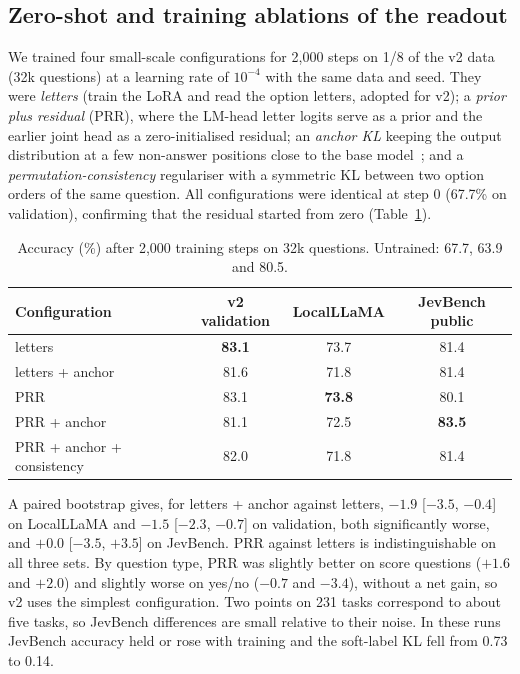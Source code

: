 \documentclass[10pt]{article}
\begin{document}
\subsection{Zero-shot and training ablations of the readout}
\label{sec:ablate}

We trained four small-scale configurations for 2,000 steps on 1/8 of the v2 data (32k questions) at a learning rate of $10^{-4}$ with the same data and seed.
They were \emph{letters} (train the LoRA and read the option letters, adopted for v2); a \emph{prior plus residual} (PRR), where the LM-head letter logits serve as a prior and the earlier joint head as a zero-initialised residual; an \emph{anchor KL} keeping the output distribution at a few non-answer positions close to the base model~\cite{llmjev}; and a \emph{permutation-consistency} regulariser with a symmetric KL between two option orders of the same question.
All configurations were identical at step 0 (67.7\% on validation), confirming that the residual started from zero (Table~\ref{tab:ablations}).

\begin{table}[t]
\centering\small
\caption{Accuracy (\%) after 2,000 training steps on 32k questions. Untrained: 67.7, 63.9 and 80.5.}
\label{tab:ablations}
\begin{tabular}{lccc}
\toprule
Configuration & v2 validation & LocalLLaMA & JevBench public \\
\midrule
letters & \textbf{83.1} & 73.7 & 81.4 \\
letters + anchor & 81.6 & 71.8 & 81.4 \\
PRR & 83.1 & \textbf{73.8} & 80.1 \\
PRR + anchor & 81.1 & 72.5 & \textbf{83.5} \\
PRR + anchor + consistency & 82.0 & 71.8 & 81.4 \\
\bottomrule
\end{tabular}
\end{table}

A paired bootstrap gives, for letters + anchor against letters, $-1.9$ [$-3.5$, $-0.4$] on LocalLLaMA and $-1.5$ [$-2.3$, $-0.7$] on validation, both significantly worse, and $+0.0$ [$-3.5$, $+3.5$] on JevBench.
PRR against letters is indistinguishable on all three sets.
By question type, PRR was slightly better on score questions ($+1.6$ and $+2.0$) and slightly worse on yes/no ($-0.7$ and $-3.4$), without a net gain, so v2 uses the simplest configuration.
Two points on 231 tasks correspond to about five tasks, so JevBench differences are small relative to their noise.
In these runs JevBench accuracy held or rose with training and the soft-label KL fell from 0.73 to 0.14.
\end{document}
